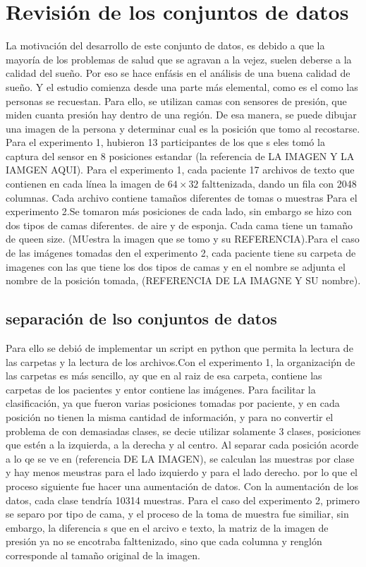 \documentclass[12pt,a4paper]{report}
\begin{document}
\chapter{Revisión de los conjuntos de datos}
La motivación del desarrollo de este conjunto de datos, es debido a que la mayoría de los problemas de salud que se agravan a la vejez, suelen deberse a la calidad del sueño. Por eso se hace enfásis en el análisis de una buena calidad de sueño. Y el estudio comienza desde una parte más elemental, como es el como las personas se recuestan. Para ello, se utilizan camas con sensores de presión, que miden cuanta presión hay dentro de una región. De esa manera, se puede dibujar una imagen de la persona y determinar cual es  la posición que tomo al recostarse.
Para el experimento 1, hubieron 13 participantes de los que s eles tomó la captura del sensor en 8 posiciones estandar (la referencia de LA IMAGEN Y LA IAMGEN AQUI).
Para el experimento 1, cada paciente 17 archivos de texto que contienen en cada línea la imagen de $64 \times 32$ falttenizada, dando un fila con 2048 columnas.
Cada archivo contiene tamaños diferentes de tomas o muestras 
Para el experimento 2.Se tomaron más posiciones de cada lado, sin embargo se hizo con dos tipos de camas diferentes. de aire y de esponja.
Cada cama tiene un tamaño de queen size.
(MUestra la imagen que se tomo y su REFERENCIA).Para el caso de las imágenes tomadas den el experimento 2, cada paciente tiene su carpeta de imagenes con las que tiene los dos tipos de camas y en el nombre se adjunta el nombre de la posición tomada, (REFERENCIA DE LA IMAGNE Y SU nombre).

\section {separación de lso conjuntos de datos}
Para ello se debió de implementar un script en python que permita la lectura de las carpetas y la lectura de los archivos.Con el experimento 1, la organizaciṕn de las carpetas es más sencillo, ay que en al raiz de esa carpeta, contiene las carpetas de los pacientes y entor contiene las imágenes.
Para facilitar la clasificación, ya que fueron varias posiciones tomadas por paciente, y en cada posición no tienen la misma cantidad de información, y para no convertir el problema de con demasiadas clases, se decie utilizar solamente 3 clases, posiciones que estén a la izquierda, a la derecha y al centro.
Al separar cada posición acorde a lo qe se ve en (referencia DE LA IMAGEN), se calculan las muestras por clase y hay menos meustras para el lado izquierdo y para el lado derecho. por lo que el proceso siguiente fue hacer una aumentación de datos. Con la aumentación de los datos, cada clase tendría 10314 muestras.
Para el caso del experimento 2, primero se separo por tipo de cama, y el proceso de la toma de muestra fue similiar, sin embargo, la diferencia s que en el arcivo e texto, la matriz de la imagen de presión ya no se encotraba falttenizado, sino que cada columna y renglón corresponde al tamaño original de la imagen.
\end{document}
